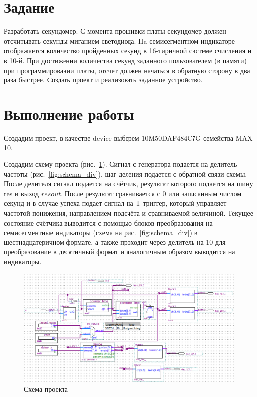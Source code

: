 \documentclass[a4paper,14pt]{article}
\begin{document}

\tableofcontents
\pagebreak

\section{Задание}

Разработать секундомер. 
С момента прошивки платы секундомер должен отсчитывать секунды миганием светодиода.
Ha семисегментном индикаторе отображается количество пройденных секунд в 16-тиричной системе счисления и в 10-й. 
При достижении количества секунд заданного пользователем (в памяти) при программировании платы, отсчет должен начаться в обратную сторону в два раза быстрее. 
Создать проект и реализовать заданное устройство.

\section{Выполнение работы}

Создадим проект, в качестве device выберем 10M50DAF484C7G семейства MAX 10.

Создадим схему проекта (рис.~\ref{fig:schema}).
Сигнал с генератора подается на делитель частоты (рис.~\ref{fig:schema_div}), шаг деления подается с обратной связи схемы. После делителя сигнал подается на счётчик, результат которого подается на шину res и выход $resout$.
После результат сравнивается с 0 или записанным числом секунд и в случае успеха подает сигнал на T-триггер, который управляет частотой понижения, направлением подсчёта и сравниваемой величиной.
Текущее состояние счётчика выводится с помощью блоков преобразования на семисегментные индикаторы (схема на рис.~\ref{fig:schema_div}) в шестнадцатеричном формате, а также проходит через делитель на 10 для преобразование в десятичный формат и аналогичным образом выводится на индикаторы.

\begin{figure}[H]
	\centering
	\includegraphics[width=\linewidth]{image/schema}
	\caption{Схема проекта}
	\label{fig:schema}
\end{figure}
\end{document}
